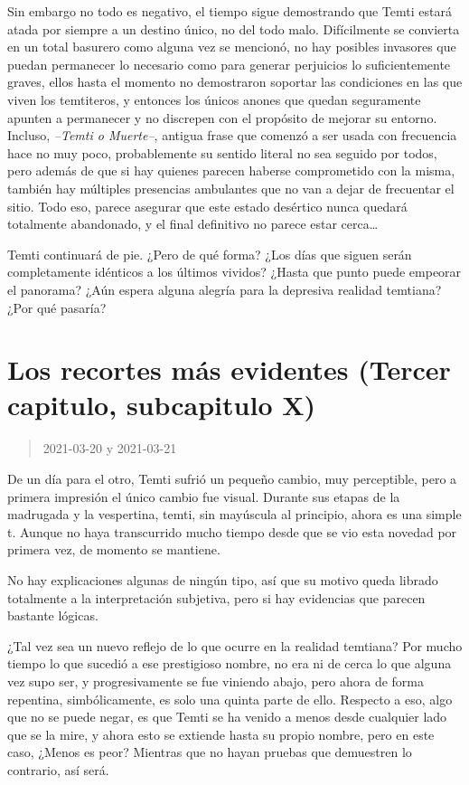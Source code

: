 \documentclass[
  spanish,
]{book}
\begin{document}
Sin embargo no todo es negativo, el tiempo sigue demostrando que Temti estará atada por siempre a un destino único, no del todo malo. Difícilmente se convierta en un total basurero como alguna vez se mencionó, no hay posibles invasores que puedan permanecer lo necesario como para generar perjuicios lo suficientemente graves, ellos hasta el momento no demostraron soportar las condiciones en las que viven los temtiteros, y entonces los únicos anones que quedan seguramente apunten a permanecer y no discrepen con el propósito de mejorar su entorno.
Incluso, \emph{--Temti o Muerte--}, antigua frase que comenzó a ser usada con frecuencia hace no muy poco, probablemente su sentido literal no sea seguido por todos, pero además de que si hay quienes parecen haberse comprometido con la misma, también hay múltiples presencias ambulantes que no van a dejar de frecuentar el sitio. Todo eso, parece asegurar que este estado desértico nunca quedará totalmente abandonado, y el final definitivo no parece estar cerca\ldots{}

Temti continuará de pie. ¿Pero de qué forma? ¿Los días que siguen serán completamente idénticos a los últimos vividos? ¿Hasta que punto puede empeorar el panorama? ¿Aún espera alguna alegría para la depresiva realidad temtiana? ¿Por qué pasaría?

\hypertarget{los-recortes-muxe1s-evidentes-tercer-capitulo-subcapitulo-x}{%
\section{Los recortes más evidentes (Tercer capitulo, subcapitulo X)}\label{los-recortes-muxe1s-evidentes-tercer-capitulo-subcapitulo-x}}

\begin{quote}
2021-03-20 y 2021-03-21
\end{quote}

De un día para el otro, Temti sufrió un pequeño cambio, muy perceptible, pero a primera impresión el único cambio fue visual. Durante sus etapas de la madrugada y la vespertina, temti, sin mayúscula al principio, ahora es una simple t. Aunque no haya transcurrido mucho tiempo desde que se vio esta novedad por primera vez, de momento se mantiene.

No hay explicaciones algunas de ningún tipo, así que su motivo queda librado totalmente a la interpretación subjetiva, pero si hay evidencias que parecen bastante lógicas.

¿Tal vez sea un nuevo reflejo de lo que ocurre en la realidad temtiana? Por mucho tiempo lo que sucedió a ese prestigioso nombre, no era ni de cerca lo que alguna vez supo ser, y progresivamente se fue viniendo abajo, pero ahora de forma repentina, simbólicamente, es solo una quinta parte de ello.
Respecto a eso, algo que no se puede negar, es que Temti se ha venido a menos desde cualquier lado que se la mire, y ahora esto se extiende hasta su propio nombre, pero en este caso, ¿Menos es peor?
Mientras que no hayan pruebas que demuestren lo contrario, así será.
\end{document}
